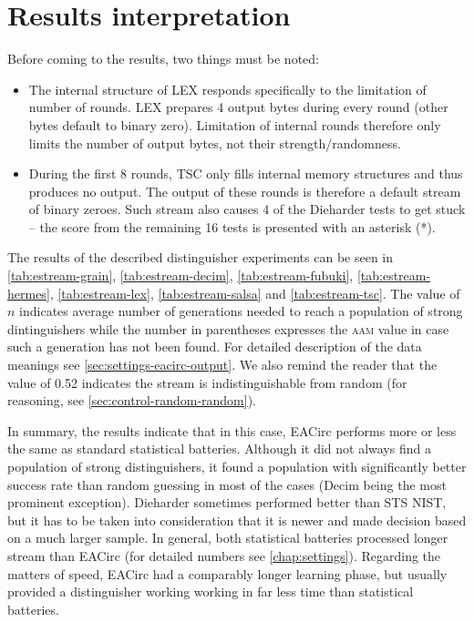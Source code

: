 \documentclass[12pt,oneside]{fithesis2}
\begin{document}
\section{Results interpretation}
\label{sec:estream-results}

Before coming to the results, two things must be noted:
\begin{itemize} \rightskip=2em
\item The internal structure of LEX responds specifically to the limitation of number of rounds.
LEX prepares 4 output bytes during every round (other bytes default to binary zero). 
Limitation of internal rounds therefore only limits the number
of output bytes, not their strength/randomness.
\item During the first 8 rounds, TSC only fills internal memory structures and thus produces no output. The output of these rounds
is therefore a default stream of binary zeroes. Such stream also causes 4 of the Dieharder tests to get stuck --
the score from the remaining 16 tests is presented with an asterisk (*).
\end{itemize}

\noindent
The results of the described distinguisher experiments can be seen in \autoref{tab:estream-grain}, \autoref{tab:estream-decim},
\autoref{tab:estream-fubuki}, \autoref{tab:estream-hermes}, \autoref{tab:estream-lex}, \autoref{tab:estream-salsa} and 
\autoref{tab:estream-tsc}. The value of $n$ indicates average number of generations needed to reach a population of
strong dintinguishers while the number in parentheses expresses the \textsc{aam} value in case such a generation has not been
found. For detailed description of the data meanings see \autoref{sec:settings-eacirc-output}. We also remind the reader
that the value of 0.52 indicates the stream is indistinguishable from random (for reasoning, see \autoref{sec:control-random-random}).

In summary, the results indicate that in this case, EACirc performs more or less the same as standard statistical batteries.
Although it did not always find a population of strong distinguishers, it found a population with significantly better
success rate than random guessing in most of the cases (Decim being the most prominent exception).
Dieharder sometimes performed better than STS NIST, but it has to be taken into consideration that it is newer
and made decision based on a much larger sample. In general, both statistical batteries processed longer stream than EACirc
(for detailed numbers see \autoref{chap:settings}). Regarding the matters of speed, EACirc had a comparably longer learning phase,
but usually provided a distinguisher working working in far less time than statistical batteries.
\medskip
\end{document}
